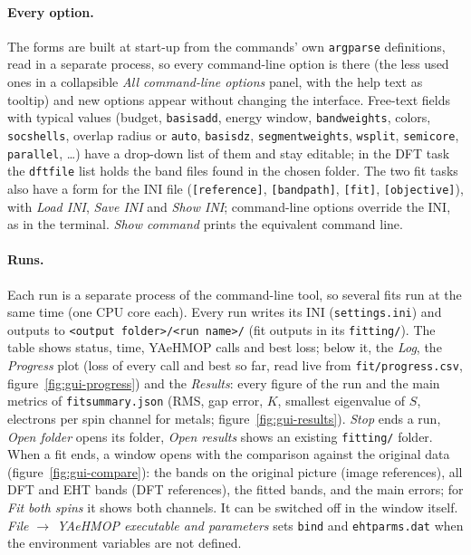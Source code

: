 \documentclass[11pt,a4paper]{article}
\newcommand{\cmd}[1]{\texttt{#1}}
\renewcommand{\_}{\origunderscore\allowbreak}
\begin{document}
\paragraph{Every option.} The forms are built at start-up from the commands' own \cmd{argparse} definitions,
read in a separate process, so every command-line option is there (the less used ones in a collapsible
\emph{All command-line options} panel, with the help text as tooltip) and new options appear without changing the
interface. Free-text fields with typical values (budget, \cmd{basis\_add}, energy window, \cmd{band\_weights},
colors, \cmd{soc\_shells}, overlap radius or \cmd{auto}, \cmd{basis\_dz}, \cmd{segment\_weights}, \cmd{w\_split},
\cmd{semicore}, \cmd{parallel}, \ldots) have a drop-down list of them and stay editable; in the DFT task the
\cmd{dft\_file} list holds the band files found in the chosen folder. The two fit tasks also have a form for the INI file (\cmd{[reference]}, \cmd{[band\_path]},
\cmd{[fit]}, \cmd{[objective]}), with \emph{Load INI}, \emph{Save INI} and \emph{Show INI}; command-line options
override the INI, as in the terminal. \emph{Show command} prints the equivalent command line.

\paragraph{Runs.} Each run is a separate process of the command-line tool, so several fits run at the same time
(one CPU core each). Every run writes its INI (\cmd{settings.ini}) and outputs to
\cmd{<output folder>/<run name>/} (fit outputs in its \cmd{fitting/}). The table shows status, time, YAeHMOP calls
and best loss; below it, the \emph{Log}, the \emph{Progress} plot (loss of every call and best so far, read live from
\cmd{fit/progress.csv}, figure~\ref{fig:gui-progress}) and the \emph{Results}: every figure of the run and the main
metrics of \cmd{fit\_summary.json} (RMS, gap error, $K$, smallest eigenvalue of $S$, electrons per spin channel for
metals; figure~\ref{fig:gui-results}). \emph{Stop} ends a run, \emph{Open folder} opens its folder, \emph{Open
results} shows an existing \cmd{fitting/} folder. When a fit ends, a window opens with the comparison against the
original data (figure~\ref{fig:gui-compare}): the bands on the original picture (image references), all DFT and
EHT bands (DFT references), the fitted bands, and the main errors; for \emph{Fit both spins} it shows both channels.
It can be switched off in the window itself. \emph{File $\to$ YAeHMOP executable and parameters} sets
\cmd{bind} and \cmd{eht\_parms.dat} when the environment variables are not defined.
\end{document}
